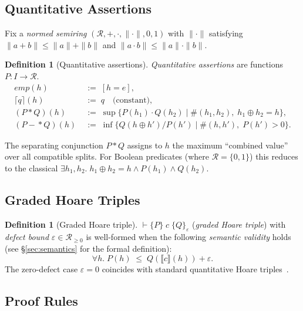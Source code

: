 \documentclass[acmsmall,sigplan,anonymous,review,screen]{acmart}
\theoremstyle{plain}
\theoremstyle{definition}
\newtheorem{definition}[theorem]{Definition}
\newcommand{\emp}{\mathit{emp}}
\newcommand{\sep}{*}
\newcommand{\wand}{-\!\!*}
\newcommand{\norm}[1]{\|#1\|}
\newcommand{\defect}{\varepsilon}
\begin{document}
\subsection{Quantitative Assertions}
\label{sec:qsl:assertions}

Fix a \emph{normed semiring} $(\mathcal{R}, +, \cdot, \norm{\cdot}, 0, 1)$
with $\norm{\cdot}$ satisfying $\norm{a + b} \leq \norm{a} + \norm{b}$
and $\norm{a \cdot b} \leq \norm{a} \cdot \norm{b}$.

\begin{definition}[Quantitative assertions]
\label{def:qassert}
  \emph{Quantitative assertions} are functions $P : I \to \mathcal{R}$.
  \begin{align*}
    \emp(h) &\;:=\; [h = e], \\
    \lceil q \rceil(h) &\;:=\; q \quad \text{(constant)}, \\
    (P \sep Q)(h) &\;:=\; \sup\{ P(h_1) \cdot Q(h_2) \mid \#(h_1, h_2),\; h_1 \oplus h_2 = h \}, \\
    (P \wand Q)(h) &\;:=\; \inf\{ Q(h \oplus h') / P(h') \mid \#(h, h'),\; P(h') > 0 \}.
  \end{align*}
\end{definition}

The separating conjunction $P \sep Q$ assigns to $h$ the maximum
``combined value'' over all compatible splits.  For Boolean predicates
(where $\mathcal{R} = \{0,1\}$) this reduces to the classical
$\exists h_1, h_2.\; h_1 \oplus h_2 = h \land P(h_1) \land Q(h_2)$.

\subsection{Graded Hoare Triples}
\label{sec:qsl:triples}

\begin{definition}[Graded Hoare triple]
\label{def:triple}
  $\vdash \{P\}\; c\; \{Q\}_\defect$ (\emph{graded Hoare triple}) with
  \emph{defect bound} $\defect \in \mathcal{R}_{\geq 0}$ is well-formed
  when the following \emph{semantic validity} holds (see
  \S\ref{sec:semantics} for the formal definition):
  \[
    \forall h.\; P(h) \;\leq\; Q(\llbracket c \rrbracket(h)) + \defect.
  \]
  The zero-defect case $\defect = 0$ coincides with standard quantitative
  Hoare triples~\cite{aguirre2021general}.
\end{definition}

\subsection{Proof Rules}
\label{sec:qsl:rules}
\end{document}
